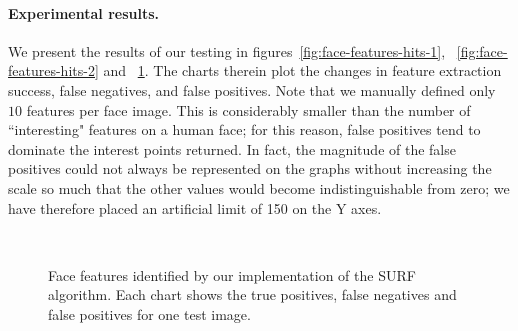 \paragraph{Experimental results.}
We present the results of our testing in figures~\ref{fig:face-features-hits-1}, ~\ref{fig:face-features-hits-2} and ~\ref{fig:face-features-hits-3}. The charts therein plot the changes in feature extraction success, false negatives, and false positives. Note that we manually defined only $10$ features per face image. This is considerably smaller than the number of ``interesting" features on a human face; for this reason, false positives tend to dominate the interest points returned. In fact, the magnitude of the false positives could not always be represented on the graphs without increasing the scale so much that the other values would become indistinguishable from zero; we have therefore placed an artificial limit of 150 on the Y axes.

\begin{figure} [h]
  \centering
  \\
  \caption[Face features identified by our SURF implementation (images 5 \& 6)]{Face features identified by our implementation of the SURF algorithm. Each chart shows the true positives, false negatives and false positives for one test image.}
  \label{fig:face-features-hits-3}
\end{figure}

